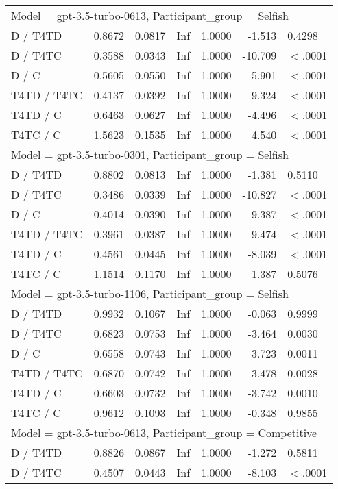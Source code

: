 \begin{table}[ht]
\begin{tabular}{lrrrrrl}
   \hline
\multicolumn{7}{l}{Model = gpt-3.5-turbo-0613, Participant_group = Selfish}\\
D / T4TD & 0.8672 & 0.0817 & Inf & 1.0000 & -1.513 & 0.4298 \\ 
  D / T4TC & 0.3588 & 0.0343 & Inf & 1.0000 & -10.709 & $<$.0001 \\ 
  D / C & 0.5605 & 0.0550 & Inf & 1.0000 & -5.901 & $<$.0001 \\ 
  T4TD / T4TC & 0.4137 & 0.0392 & Inf & 1.0000 & -9.324 & $<$.0001 \\ 
  T4TD / C & 0.6463 & 0.0627 & Inf & 1.0000 & -4.496 & $<$.0001 \\ 
  T4TC / C & 1.5623 & 0.1535 & Inf & 1.0000 & 4.540 & $<$.0001 \\ 
   \hline
\multicolumn{7}{l}{Model = gpt-3.5-turbo-0301, Participant_group = Selfish}\\
D / T4TD & 0.8802 & 0.0813 & Inf & 1.0000 & -1.381 & 0.5110 \\ 
  D / T4TC & 0.3486 & 0.0339 & Inf & 1.0000 & -10.827 & $<$.0001 \\ 
  D / C & 0.4014 & 0.0390 & Inf & 1.0000 & -9.387 & $<$.0001 \\ 
  T4TD / T4TC & 0.3961 & 0.0387 & Inf & 1.0000 & -9.474 & $<$.0001 \\ 
  T4TD / C & 0.4561 & 0.0445 & Inf & 1.0000 & -8.039 & $<$.0001 \\ 
  T4TC / C & 1.1514 & 0.1170 & Inf & 1.0000 & 1.387 & 0.5076 \\ 
   \hline
\multicolumn{7}{l}{Model = gpt-3.5-turbo-1106, Participant_group = Selfish}\\
D / T4TD & 0.9932 & 0.1067 & Inf & 1.0000 & -0.063 & 0.9999 \\ 
  D / T4TC & 0.6823 & 0.0753 & Inf & 1.0000 & -3.464 & 0.0030 \\ 
  D / C & 0.6558 & 0.0743 & Inf & 1.0000 & -3.723 & 0.0011 \\ 
  T4TD / T4TC & 0.6870 & 0.0742 & Inf & 1.0000 & -3.478 & 0.0028 \\ 
  T4TD / C & 0.6603 & 0.0732 & Inf & 1.0000 & -3.742 & 0.0010 \\ 
  T4TC / C & 0.9612 & 0.1093 & Inf & 1.0000 & -0.348 & 0.9855 \\ 
   \hline
\multicolumn{7}{l}{Model = gpt-3.5-turbo-0613, Participant_group = Competitive}\\
D / T4TD & 0.8826 & 0.0867 & Inf & 1.0000 & -1.272 & 0.5811 \\ 
  D / T4TC & 0.4507 & 0.0443 & Inf & 1.0000 & -8.103 & $<$.0001 \\ 

\end{tabular}
\end{table}
